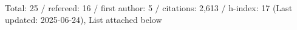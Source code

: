 Total: 25 / refereed: 16 / first author: 5 / citations: 2,613 / h-index: 17 (Last updated: 2025-06-24), List attached below